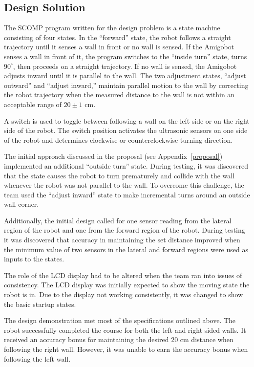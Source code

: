 \subsection{Design Solution}

The SCOMP program written for the design problem is a state machine
consisting of four states. In the ``forward'' state, the
robot follows a straight trajectory until it senses a wall in front or
no wall is sensed. If the Amigobot senses a wall in front of it, the program
switches to the ``inside turn'' state, turns \(90^\circ\), then proceeds
on a straight trajectory. If no wall is sensed, the Amigobot adjusts
inward until it is parallel to the wall. The two adjustment states,
``adjust outward'' and ``adjust inward,'' maintain parallel motion to the
wall by correcting the robot trajectory when the measured distance to
the wall is not within an acceptable range of \(20\pm 1\) cm.

A switch is used to toggle between following a wall on the left side
or on the right side of the robot. The switch position activates the
ultrasonic sensors on one side of the robot and determines clockwise
or counterclockwise turning direction.

The initial approach discussed in the proposal (see
Appendix~\ref{proposal}) implemented an
additional ``outside turn'' state. During testing, it was discovered
that the state causes the robot to turn prematurely and collide with
the wall whenever the robot was not parallel to the wall. To overcome
this challenge, the team used the ``adjust inward'' state to make
incremental turns around an outside wall corner.

Additionally, the initial design called for one sensor reading from
the lateral region of the robot and one from the forward region of the
robot. During
testing it was discovered that accuracy in maintaining the set
distance improved when the minimum value of two sensors in the lateral
and forward regions were used as inputs to the states.

The role of the LCD display had to be altered when the team ran into
issues of consistency. The LCD display was initially expected to show
the moving state the robot is in. Due to the display not working
consistently, it was changed to show the basic startup states.

The design demonstration met most of the specifications outlined
above. The robot successfully completed the course for both the left
and right sided walls. It received an accuracy bonus for maintaining
the desired 20 cm distance when following the right wall. However, it
was unable to earn the accuracy bonus when following the left wall.
